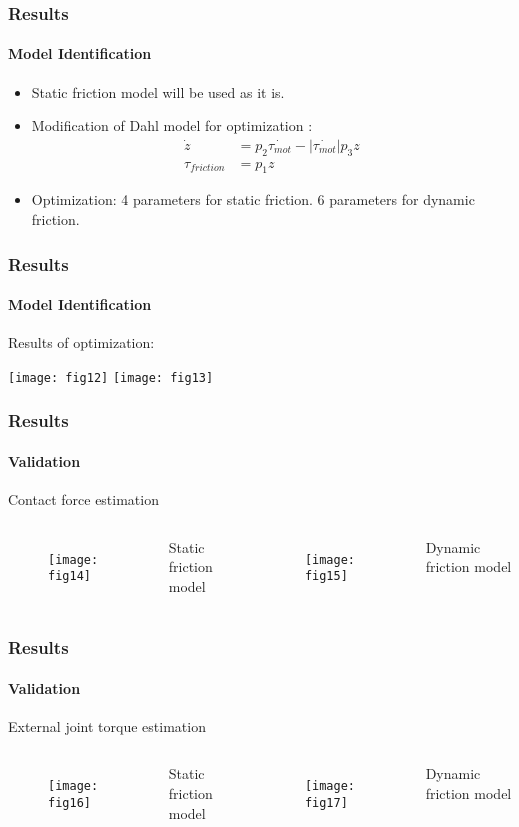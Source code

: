 \documentclass[12pt,english]{beamer}
\begin{document}
  \begin{frame}
    \frametitle{Results}
    \framesubtitle{Model Identification}
    \begin{itemize}
    \item Static friction model will be used as it is.
    \item Modification of Dahl model for optimization :
    \begin{align}
      \dot{z} &= p_{2 }\dot{\tau_{mot}} - \left|\dot{\tau_{mot}}\right| p_{3} z \\
      \tau_{friction} &= p_{1} z
    \end{align}
    \item Optimization: 4 parameters for static friction. 6 parameters for dynamic friction.
    \end{itemize}
  \end{frame}
  
  
  \begin{frame}
    \frametitle{Results}
    \framesubtitle{Model Identification}
    Results of optimization:
    \begin{center}
      \texttt{[image: fig12]}
      \texttt{[image: fig13]}
    \end{center}
  \end{frame}
  
  
  \begin{frame}
    \frametitle{Results}
    \framesubtitle{Validation}
    Contact force estimation
    \begin{columns}
      \centering
        \begin{figure}
          \texttt{[image: fig14]}
        \end{figure}
        Static friction model
      \centering
        \begin{figure}
          \texttt{[image: fig15]}
        \end{figure}
        Dynamic friction model
    \end{columns}
  \end{frame}

  \begin{frame}
    \frametitle{Results}
    \framesubtitle{Validation}
    External joint torque estimation
    \begin{columns}
      \centering
        \begin{figure}
          \texttt{[image: fig16]}
        \end{figure}
        Static friction model
      \centering
        \begin{figure}
          \texttt{[image: fig17]}
        \end{figure}
        Dynamic friction model
    \end{columns}
  \end{frame}
  
\end{document}
